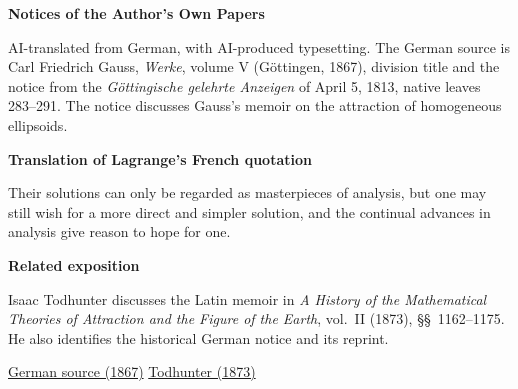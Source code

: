 \clearpage
\thispagestyle{empty}
\begin{center}\Large\textbf{Notices of the Author’s Own Papers}\end{center}

AI-translated from German, with AI-produced typesetting. The German source is Carl Friedrich Gauss, \textit{Werke}, volume V (Göttingen, 1867), division title and the notice from the \textit{Göttingische gelehrte Anzeigen} of April 5, 1813, native leaves 283--291. The notice discusses Gauss’s memoir on the attraction of homogeneous ellipsoids.

\noindent\textbf{Translation of Lagrange’s French quotation}\par\smallskip
\noindent Their solutions can only be regarded as masterpieces of analysis, but one may still wish for a more direct and simpler solution, and the continual advances in analysis give reason to hope for one.

\medskip\noindent\textbf{Related exposition}\par\smallskip
\noindent Isaac Todhunter discusses the Latin memoir in \textit{A History of the Mathematical Theories of Attraction and the Figure of the Earth}, vol.~II (1873), §§~1162--1175. He also identifies the historical German notice and its reprint.

\medskip\noindent\href{https://gdz.sub.uni-goettingen.de/id/PPN236006339}{German source (1867)}\quad
\href{https://www.gutenberg.org/ebooks/69832}{Todhunter (1873)}
\clearpage

